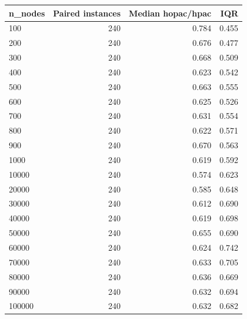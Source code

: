 \begin{tabular}{lrrr}
\toprule
n\_nodes & Paired instances & Median hopac/hpac & IQR \\
\midrule
100 & 240 & 0.784 & 0.455 \\
200 & 240 & 0.676 & 0.477 \\
300 & 240 & 0.668 & 0.509 \\
400 & 240 & 0.623 & 0.542 \\
500 & 240 & 0.663 & 0.555 \\
600 & 240 & 0.625 & 0.526 \\
700 & 240 & 0.631 & 0.554 \\
800 & 240 & 0.622 & 0.571 \\
900 & 240 & 0.670 & 0.563 \\
1000 & 240 & 0.619 & 0.592 \\
10000 & 240 & 0.574 & 0.623 \\
20000 & 240 & 0.585 & 0.648 \\
30000 & 240 & 0.612 & 0.690 \\
40000 & 240 & 0.619 & 0.698 \\
50000 & 240 & 0.655 & 0.690 \\
60000 & 240 & 0.624 & 0.742 \\
70000 & 240 & 0.633 & 0.705 \\
80000 & 240 & 0.636 & 0.669 \\
90000 & 240 & 0.632 & 0.694 \\
100000 & 240 & 0.632 & 0.682 \\
\bottomrule
\end{tabular}
